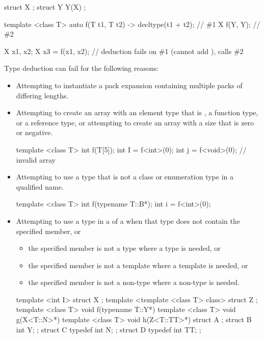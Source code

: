 \pnum
\begin{example}
\begin{codeblock}
struct X { };
struct Y {
  Y(X) {}
};

template <class T> auto f(T t1, T t2) -> decltype(t1 + t2);     // \#1
X f(Y, Y);                                                      // \#2

X x1, x2;
X x3 = f(x1, x2);   // deduction fails on \#1 (cannot add ), calls \#2
\end{codeblock}
\end{example}

\pnum
\begin{note}
Type deduction can fail for the following reasons:
\begin{itemize}
\item Attempting to instantiate a pack expansion containing multiple packs of differing lengths.
\item
Attempting to create an array with an element type that is , a
function type, or a reference type, or attempting
to create an array with a size that is zero or negative.
\begin{example}
\begin{codeblock}
template <class T> int f(T[5]);
int I = f<int>(0);
int j = f<void>(0);             // invalid array
\end{codeblock}
\end{example}
\item
Attempting to use a type that is not a class or enumeration type in a qualified name.
\begin{example}
\begin{codeblock}
template <class T> int f(typename T::B*);
int i = f<int>(0);
\end{codeblock}
\end{example}
\item
Attempting to use a type in a  of a
 when
that type does not contain the specified member, or
\begin{itemize}
\item
the specified member is not a type where a type is needed, or
\item
the specified member is not a template where a template is needed, or
\item
the specified member is not a non-type where a non-type is needed.
\end{itemize}
\begin{example}
\begin{codeblock}
template <int I> struct X { };
template <template <class T> class> struct Z { };
template <class T> void f(typename T::Y*) {}
template <class T> void g(X<T::N>*) {}
template <class T> void h(Z<T::TT>*) {}
struct A {};
struct B { int Y; };
struct C {
  typedef int N;
};
struct D {
  typedef int TT;
};


\end{codeblock}
\end{example}
\end{itemize}
\end{note}
